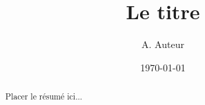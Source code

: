 \documentclass{article}
\title{Le titre}
\author{A. Auteur}
\date{\today}
\begin{document}
\maketitle

\begin{abstract}
Placer le résumé ici...
\end{abstract}
\end{document}

